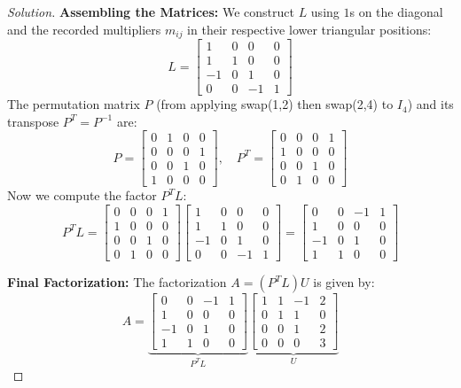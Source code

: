 \documentclass[11pt, a4paper]{article}
\newif\ifsolutionnewpage
\newenvironment{solution}
  {\begin{proof}[Solution]}
  {\end{proof}\ifsolutionnewpage\newpage\fi}
\begin{document}
\begin{solution}
    \textbf{Assembling the Matrices:}
    We construct $L$ using $1$s on the diagonal and the recorded multipliers $m_{ij}$ in their respective lower triangular positions:
    \[
    L = \begin{bmatrix} 1&0&0&0 \\ 1&1&0&0 \\ -1&0&1&0 \\ 0&0&-1&1 \end{bmatrix}
    \]
    The permutation matrix $P$ (from applying swap(1,2) then swap(2,4) to $I_4$) and its transpose $P^T = P^{-1}$ are:
    \[
    P = \begin{bmatrix} 0&1&0&0 \\ 0&0&0&1 \\ 0&0&1&0 \\ 1&0&0&0 \end{bmatrix}, \quad 
    P^T = \begin{bmatrix} 0&0&0&1 \\ 1&0&0&0 \\ 0&0&1&0 \\ 0&1&0&0 \end{bmatrix}
    \]
    Now we compute the factor $P^T L$:
    \[
    P^T L = \begin{bmatrix} 0&0&0&1 \\ 1&0&0&0 \\ 0&0&1&0 \\ 0&1&0&0 \end{bmatrix} 
    \begin{bmatrix} 1&0&0&0 \\ 1&1&0&0 \\ -1&0&1&0 \\ 0&0&-1&1 \end{bmatrix} = 
    \begin{bmatrix} 0&0&-1&1 \\ 1&0&0&0 \\ -1&0&1&0 \\ 1&1&0&0 \end{bmatrix}
    \]
    
    \textbf{Final Factorization:}
    The factorization $A = (P^T L)U$ is given by:
    \[
    A = \underbrace{\begin{bmatrix} 0&0&-1&1 \\ 1&0&0&0 \\ -1&0&1&0 \\ 1&1&0&0 \end{bmatrix}}_{P^T L} 
    \underbrace{\begin{bmatrix} 1&1&-1&2 \\ 0&1&1&0 \\ 0&0&1&2 \\ 0&0&0&3 \end{bmatrix}}_{U}
    \]
\end{solution}
\end{document}
